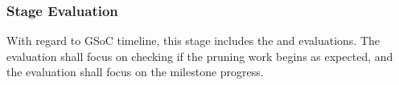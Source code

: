 \subsubsection*{Stage Evaluation}

With regard to GSoC timeline, this stage includes the  and  evaluations. The  evaluation shall focus on checking if the pruning work begins as expected, and the  evaluation shall focus on the milestone progress.
